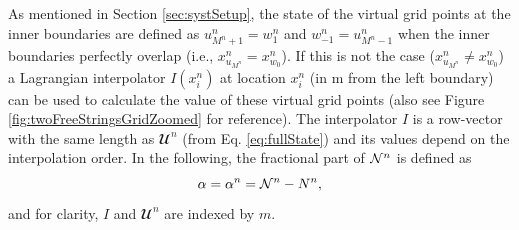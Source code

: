 As mentioned in Section \ref{sec:systSetup}, the state of the virtual grid points at the inner boundaries are defined as $u_{M^n+1}^n = w_1^n$ and $w_{-1}^n = u_{M^n-1}^n$ when the inner boundaries perfectly overlap  (i.e., $x^n_{u_{M^n}} = x^n_{w_0}$). If this is not the case ($x^n_{u_{M^n}} \neq x^n_{w_0}$) a Lagrangian interpolator $I(x_i^n)$ at location $x_i^n$ (in m from the left boundary) can be used to calculate the value of these virtual grid points (also see Figure \ref{fig:twoFreeStringsGridZoomed} for reference). The interpolator $I$ is a row-vector with the same length as $\mathbfcal{U}^n$ (from Eq. \eqref{eq:fullState}) and its values depend on the interpolation order. %
In the following, the fractional part of $\mathcal{N}^n$ %
is defined as 
\begin{equation}\label{eq:alphaDef}
    \alpha = \alpha^n = \Nfrac^n - N^n, %
\end{equation}
and for clarity, $I$ and $\mathbfcal{U}^n$ are indexed by $m$.
